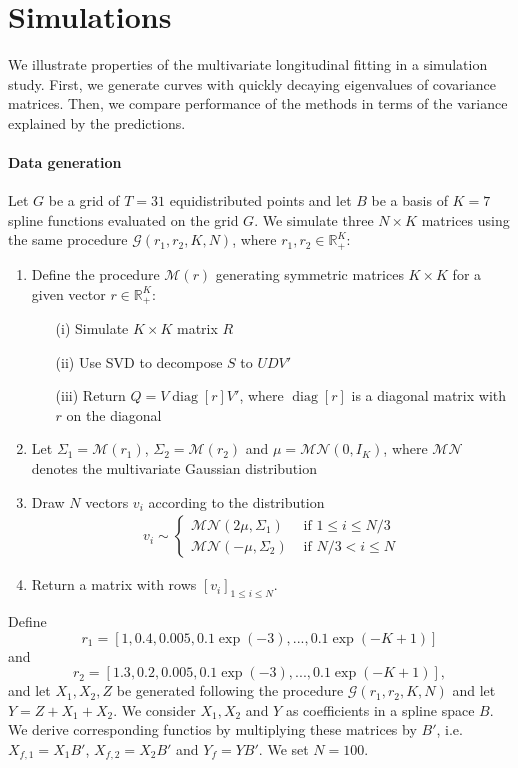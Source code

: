 \documentclass[preprint]{imsart}
\numberwithin{equation}{section}
\theoremstyle{plain}
\newcommand{\cMN}{\mathcal{MN}}
\newcommand{\cG}{\mathcal{G}}
\newcommand{\cM}{\mathcal{M}}
\newcommand{\R}{\mathbb{R}}
\DeclareMathOperator*{\diag}{diag}
\begin{document}
\section{Simulations}\label{s:simulation}

We illustrate properties of the multivariate longitudinal fitting in a simulation study. First, we generate curves with quickly decaying eigenvalues of covariance matrices. Then, we compare performance of the methods in terms of the variance explained by the predictions. %

\paragraph{Data generation} Let $G$ be a grid of $T = 31$ equidistributed points and let $B$ be a basis of $K = 7$ spline functions evaluated on the grid $G$. %
We simulate three $N \times K$ matrices using the same procedure $\cG(r_1, r_2, K, N)$, where $r_1, r_2 \in \R_+^K$:
\begin{enumerate}
\item Define the procedure $\cM(r)$ generating symmetric matrices $K \times K$ for a given vector $r \in \R_+^K$:
  \begin{enumerate}
    \item[(i)] Simulate $K \times K$ matrix $R$
    \item[(ii)] Use SVD to decompose $S$ to $UDV'$
    \item[(iii)] Return $Q = V \diag[r] V' $, where $\diag[r]$ is a diagonal matrix with $r$ on the diagonal
  \end{enumerate}
\item Let $\Sigma_1 = \cM(r_1)$, $\Sigma_2 = \cM(r_2)$ and $\mu = \cMN(0, I_K)$, where $\cMN$ denotes the multivariate Gaussian distribution
\item Draw $N$ vectors $v_i$ according to the distribution
\begin{align*}
v_i \sim 
\begin{cases}
\cMN(2\mu, \Sigma_1) & \text{ if } 1 \leq i \leq N/3\\
\cMN(-\mu, \Sigma_2) & \text{ if } N/3 < i \leq N
\end{cases}
\end{align*}
\item Return a matrix with rows $[v_i]_{1 \leq i \leq N}$.
\end{enumerate}
Define \[ r_1 = [1, 0.4, 0.005, 0.1 \exp(-3), ..., 0.1 \exp(-K+1)] \]  and \[ r_2 = [1.3, 0.2, 0.005, 0.1 \exp(-3), ..., 0.1 \exp(-K+1)],\]
and let $X_1,X_2,Z$ be generated following the procedure $\cG(r_1,r_2,K,N)$ and let $Y = Z + X_1 + X_2$. We consider $X_1,X_2$ and $Y$ as coefficients in a spline space $B$. We derive corresponding functios by multiplying these matrices by $B'$, i.e. $X_{f,1} = X_1B'$, $X_{f,2} = X_2B'$ and $Y_f = YB'$. We set $N=100$.
\end{document}
